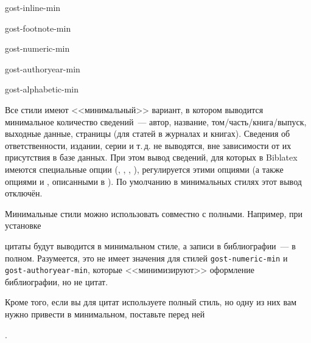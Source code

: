 \documentclass[10pt,a4paper,headings=small,numbers=enddot,english,russian]{ltxdockit}
\newcommand*{\biblatex}{Biblatex\xspace}
\newcommand*{\bibsty}{\texttt}
\begin{document}
\begin{marglist}
\item[gost-inline-min]%
\item[gost-footnote-min]\vspace{-\itemsep}\vspace{-\parsep}%
\item[gost-numeric-min]\vspace{-\itemsep}\vspace{-\parsep}%
\item[gost-authoryear-min]\vspace{-\itemsep}\vspace{-\parsep}%
\item[gost-alphabetic-min]\vspace{-\itemsep}\vspace{-\parsep}%
\item\vspace{-\itemsep}\vspace{-\parsep}%
\vspace{-4\baselineskip}%
Все стили имеют <<минимальный>> вариант, в котором выводится минимальное количество
сведений~--- автор, название, том\slash часть\slash книга\slash выпуск,
выходные данные, страницы (для статей в журналах и книгах).
Сведения об ответственности, издании, серии и т.\,д. не выводятся, вне зависимости от их присутствия в базе данных.
При этом вывод сведений, для которых в \biblatex имеются специальные опции
(, , , ), регулируется
этими опциями (а также опциями  и ,
описанными в ). По умолчанию в минимальных стилях этот вывод отключён.

Минимальные стили можно использовать совместно с полными.
Например, при установке

\begin{ltxcode}
\usepackage[%
    citestyle=gost-footnote-min,
    bibstyle=gost-footnote,
    ...
]{biblatex}
\end{ltxcode}

цитаты будут выводится в минимальном стиле, а записи в библиографии~--- в полном.
Разумеется, это не имеет значения для стилей \bibsty{gost-numeric-min} и
\bibsty{gost-authoryear-min}, которые <<минимизируют>> оформление библиографии, но не цитат.

Кроме того, если вы для цитат используете полный стиль, но одну из них вам нужно привести
в минимальном, поставьте перед ней

\begin{ltxcode}
.
\end{ltxcode}

\end{marglist}
\end{document}
